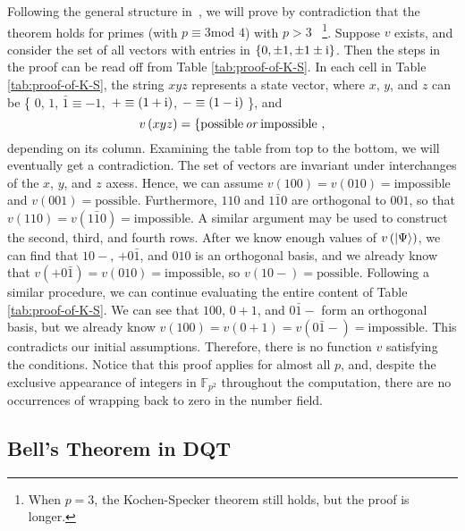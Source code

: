 \documentclass[english,12pt]{iopart}
\makeatletter
\theoremstyle{plain}
\newenvironment{proof}[1][\protect\proofname]{\par
\normalfont\topsep6\p@\@plus6\p@\relax
\trivlist
\itemindent\parindent
\item[\hskip\labelsep\scshape #1]\ignorespaces
}{%
\endtrivlist\@endpefalse
}
\providecommand{\proofname}{Proof}
\newcommand{\ff}[1]{\mathbb{F}_{#1}}
\newcommand{\mod}{\mbox{mod }}
\makeatother
\begin{document}
\begin{proof}

  Following the general structure in~\cite{peres1995quantum}, we will
  prove by contradiction that the theorem holds for primes (with
  $p \equiv 3 \mod 4$) with $p > 3$ ~\footnote{\label{fn:p>3}When
    $p=3$, the Kochen-Specker theorem still holds, but the proof is
    longer.}. Suppose $v$ exists, and consider the set of all vectors
  with entries in $\left\{ 0,\pm1,\pm1\pm\mathrm{i}\right\} $. Then the
  steps in the proof can be read off from Table
  \ref{tab:proof-of-K-S}.  In each cell in Table
  \ref{tab:proof-of-K-S}, the string $xyz$ represents a state vector,
  where $x$, $y$, and $z$ can be \{ $0$, $1$, $\bar{1}\equiv -1,$
  ${+} \equiv (1+\mathrm{i})$, ${-} \equiv (1-\mathrm{i})$ \}, and
\[
v\left( xyz \right)= \{\textrm{possible}\, \mbox{\it or\/}\,
\textrm{impossible} \ , \]
depending on its column.  Examining the table from top to the bottom,
we will eventually get a contradiction.  The set of vectors are
invariant under interchanges of the $x$, $y$, and $z$ axess.  Hence,
we can assume
$v\left(100\right)=v\left(010\right)=\textrm{impossible}$ and
$v\left(001\right)=\textrm{possible}$.  Furthermore, $110$ and
$1\bar{1}0$ are orthogonal to $001$, so that
$v\left(110\right)=v\left(1\bar{1}0\right)=\textrm{impossible}$.  A
similar argument may be used to construct the second, third, and
fourth rows.  After we know enough values of
$v\left({\left\vert{\Psi}\right\rangle}\right)$, we can find that $10{-}$, ${+}0\bar{1}$,
and $010$ is an orthogonal basis, and we already know that
$v\left({+}0\bar{1}\right)=v\left(010\right)=\textrm{impossible}$, so
$v\left(10{-}\right)=\textrm{possible}$.  Following a similar
procedure, we can continue evaluating the entire content of Table
\ref{tab:proof-of-K-S}.  We can see that $100$, $0{+}1$, and
$0\bar{1}{-}$ form an orthogonal basis, but we already know
$v\left(100\right)=v\left(0{+}1\right)=v\left(0\bar{1}{-}\right)
=\textrm{impossible}$.
This contradicts our initial assumptions. Therefore, there is no
function $v$ satisfying the conditions.
\end{proof}
Notice that this proof applies for almost all $p$, and, despite
the exclusive appearance of integers in $\ff{p^{2}}$ throughout the
computation, there are no occurrences of wrapping back to zero in the
number field.

\subsection {Bell's Theorem in DQT}
\end{document}
